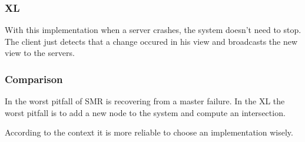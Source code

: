 \documentclass[times, 10pt,twocolumn]{article}
\begin{document}
\subsubsection{XL}


With this implementation when a server crashes, the system doesn't need to stop. The client just detects that a change occured in his view
and broadcasts the new view to the servers.

\subsubsection{Comparison}

In the worst pitfall of SMR is recovering from a master failure. In the XL the worst pitfall is to add a new node to the system and compute an intersection.

According to the context it is more reliable to choose an implementation wisely.



\end{document}
